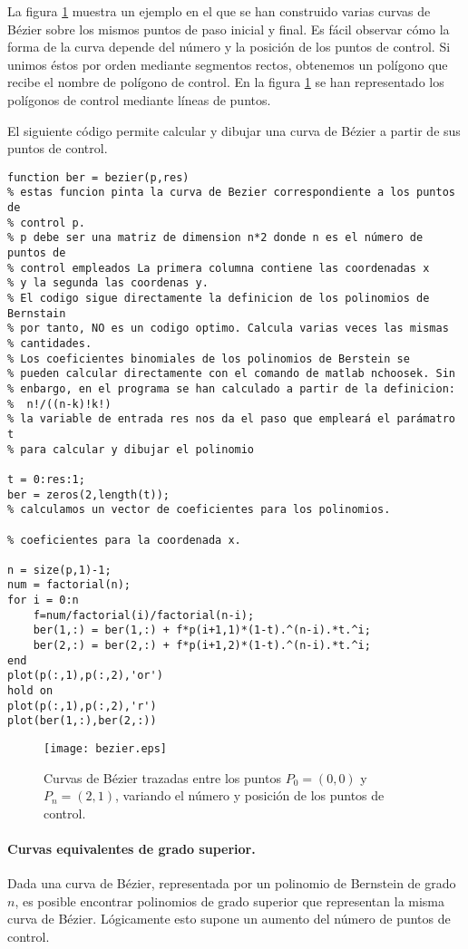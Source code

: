 La figura \ref{fig:bezier} muestra un ejemplo en el que se han construido varias curvas de Bézier sobre los mismos puntos de paso inicial y final. Es fácil observar cómo la forma de la curva depende del número y la posición de los puntos de control. Si unimos éstos por orden mediante segmentos rectos, obtenemos un polígono que recibe el nombre de polígono de control. En la figura \ref{fig:bezier} se han representado los polígonos de control mediante líneas de puntos.

El siguiente código permite calcular y dibujar una curva de Bézier a partir de sus puntos de control.
\begin{lstlisting}
function ber = bezier(p,res)
% estas funcion pinta la curva de Bezier correspondiente a los puntos de 
% control p. 
% p debe ser una matriz de dimension n*2 donde n es el número de puntos de 
% control empleados La primera columna contiene las coordenadas x 
% y la segunda las coordenas y.
% El codigo sigue directamente la definicion de los polinomios de Bernstain
% por tanto, NO es un codigo optimo. Calcula varias veces las mismas
% cantidades.
% Los coeficientes binomiales de los polinomios de Berstein se 
% pueden calcular directamente con el comando de matlab nchoosek. Sin 
% enbargo, en el programa se han calculado a partir de la definicion:
%  n!/((n-k)!k!)
% la variable de entrada res nos da el paso que empleará el parámatro t
% para calcular y dibujar el polinomio

t = 0:res:1;
ber = zeros(2,length(t));
% calculamos un vector de coeficientes para los polinomios.

% coeficientes para la coordenada x.

n = size(p,1)-1;
num = factorial(n);
for i = 0:n    
    f=num/factorial(i)/factorial(n-i);
    ber(1,:) = ber(1,:) + f*p(i+1,1)*(1-t).^(n-i).*t.^i;
    ber(2,:) = ber(2,:) + f*p(i+1,2)*(1-t).^(n-i).*t.^i;
end
plot(p(:,1),p(:,2),'or')
hold on
plot(p(:,1),p(:,2),'r')
plot(ber(1,:),ber(2,:))
\end{lstlisting}

\begin{figure}[h]
\centering
\texttt{[image: bezier.eps]} 
\caption{Curvas de Bézier trazadas entre los puntos $P_0 = (0,0)$ y $P_n = (2,1)$, variando el número y posición de los puntos de control.} 
\label{fig:bezier}
\end{figure}

\paragraph{Curvas equivalentes de grado superior.} Dada una curva de Bézier, representada por un polinomio de Bernstein de grado $n$, es posible encontrar polinomios de grado superior que representan la misma curva de Bézier. Lógicamente esto supone un aumento del número de puntos de control.

